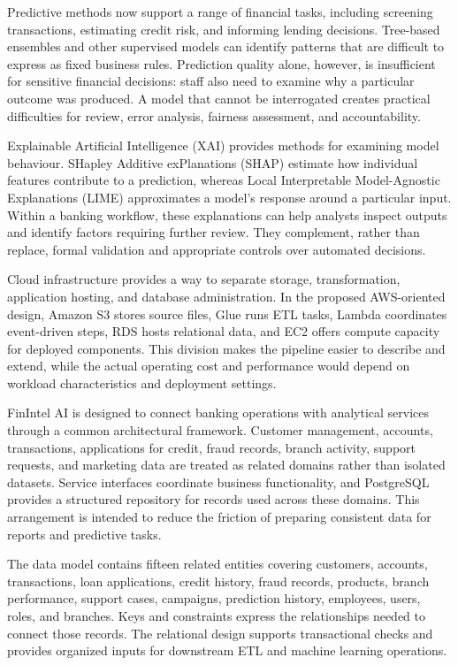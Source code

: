 \documentclass[conference]{IEEEtran}
\begin{document}
Predictive methods now support a range of financial tasks, including screening transactions, estimating credit risk, and informing lending decisions. Tree-based ensembles and other supervised models can identify patterns that are difficult to express as fixed business rules. Prediction quality alone, however, is insufficient for sensitive financial decisions: staff also need to examine why a particular outcome was produced. A model that cannot be interrogated creates practical difficulties for review, error analysis, fairness assessment, and accountability.

Explainable Artificial Intelligence (XAI) provides methods for examining model behaviour. SHapley Additive exPlanations (SHAP) estimate how individual features contribute to a prediction, whereas Local Interpretable Model-Agnostic Explanations (LIME) approximates a model's response around a particular input. Within a banking workflow, these explanations can help analysts inspect outputs and identify factors requiring further review. They complement, rather than replace, formal validation and appropriate controls over automated decisions.

Cloud infrastructure provides a way to separate storage, transformation, application hosting, and database administration. In the proposed AWS-oriented design, Amazon S3 stores source files, Glue runs ETL tasks, Lambda coordinates event-driven steps, RDS hosts relational data, and EC2 offers compute capacity for deployed components. This division makes the pipeline easier to describe and extend, while the actual operating cost and performance would depend on workload characteristics and deployment settings.

FinIntel AI is designed to connect banking operations with analytical services through a common architectural framework. Customer management, accounts, transactions, applications for credit, fraud records, branch activity, support requests, and marketing data are treated as related domains rather than isolated datasets. Service interfaces coordinate business functionality, and PostgreSQL provides a structured repository for records used across these domains. This arrangement is intended to reduce the friction of preparing consistent data for reports and predictive tasks.

The data model contains fifteen related entities covering customers, accounts, transactions, loan applications, credit history, fraud records, products, branch performance, support cases, campaigns, prediction history, employees, users, roles, and branches. Keys and constraints express the relationships needed to connect those records. The relational design supports transactional checks and provides organized inputs for downstream ETL and machine learning operations.
\end{document}
